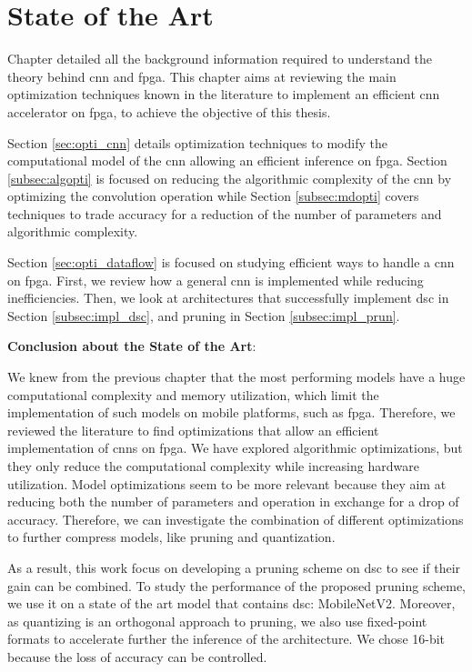 \chapter{State of the Art} \label{chap:sota}
Chapter  detailed all the background information required to understand the theory behind \acrshort{cnn} and \acrshort{fpga}. This chapter aims at reviewing the main optimization techniques known in the literature to implement an efficient \acrshort{cnn} accelerator on \acrshort{fpga}, to achieve the objective of this thesis.

Section \ref{sec:opti_cnn} details optimization techniques to modify the computational model of the \acrshort{cnn} allowing an efficient inference on \acrshort{fpga}. Section \ref{subsec:algopti} is focused on reducing the algorithmic complexity of the \acrshort{cnn} by optimizing the convolution operation while Section \ref{subsec:mdopti} covers techniques to trade accuracy for a reduction of the number of parameters and algorithmic complexity.

Section \ref{sec:opti_dataflow} is focused on studying efficient ways to handle a \acrshort{cnn} on \acrshort{fpga}. First, we review how a general \acrshort{cnn} is implemented while reducing inefficiencies. Then, we look at architectures that successfully implement \acrshort{dsc} in Section \ref{subsec:impl_dsc}, and pruning in Section \ref{subsec:impl_prun}.

%

%
\begin{tcolorbox}
    \textbf{Conclusion about the State of the Art}: \newline \newline

    We knew from the previous chapter that the most performing models have a huge computational complexity and memory utilization, which limit the implementation of such models on mobile platforms, such as \acrshort{fpga}. Therefore, we reviewed the literature to find optimizations that allow an efficient implementation of \acrshort{cnn}s on \acrshort{fpga}. We have explored algorithmic optimizations, but they only reduce the computational complexity while increasing hardware utilization. Model optimizations seem to be more relevant because they aim at reducing both the number of parameters and operation in exchange for a drop of accuracy. Therefore, we can investigate the combination of different optimizations to further compress models, like pruning and quantization. \newline \newline
    
    As a result, this work focus on developing a pruning scheme on \acrshort{dsc} to see if their gain can be combined. To study the performance of the proposed pruning scheme, we use it on a state of the art model that contains \acrshort{dsc}: MobileNetV2. Moreover, as quantizing is an orthogonal approach to pruning, we also use fixed-point formats to accelerate further the inference of the architecture. We chose 16-bit because the loss of accuracy can be controlled.
\end{tcolorbox}
\afterpage{\blankpage}
\cleardoublepage
\newpage
